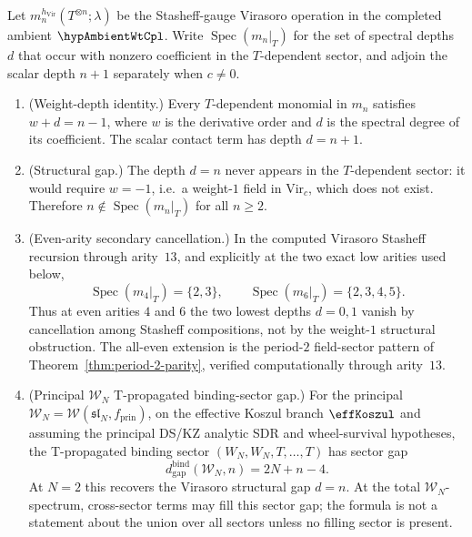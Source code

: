 \begin{theorem}
\label{thm:gap-migration}%
%
%
Let \(m_n^{h_{\mathrm{Vir}}}(T^{\otimes n};\lambda)\) be the
Stasheff-gauge Virasoro operation in the completed ambient
\(\hypAmbientWtCpl\).  Write
\(\operatorname{Spec}(m_n|_T)\) for the set of spectral depths~\(d\)
that occur with nonzero coefficient in the \(T\)-dependent sector, and
adjoin the scalar depth \(n+1\) separately when \(c\ne0\).
\begin{enumerate}[label=\textup{(\roman*)}]
\item \textup{(Weight-depth identity.)}
 Every $T$-dependent monomial in $m_n$ satisfies
 $w + d = n - 1$, where $w$ is the derivative order and $d$ is
 the spectral degree of its coefficient. The scalar contact
 term has depth $d = n + 1$.
\item \textup{(Structural gap.)}
 The depth $d = n$ never appears in the $T$-dependent sector:
 it would require $w = -1$, i.e.\ a weight-$1$ field in
 $\mathrm{Vir}_c$, which does not exist. Therefore
 $n \notin \operatorname{Spec}(m_n|_T)$ for all $n \ge 2$.
\item \textup{(Even-arity secondary cancellation.)}
 In the computed Virasoro Stasheff recursion through arity~$13$, and
 explicitly at the two exact low arities used below,
 \[
 \operatorname{Spec}(m_4|_T)=\{2,3\},
 \qquad
 \operatorname{Spec}(m_6|_T)=\{2,3,4,5\}.
 \]
 Thus at even arities \(4\) and \(6\) the two lowest depths
 \(d=0,1\) vanish by cancellation among Stasheff compositions, not by
 the weight-\(1\) structural obstruction.  The all-even extension is
 the period-\(2\) field-sector pattern of
 Theorem~\ref{thm:period-2-parity}, verified computationally through
 arity~$13$.
\item \textup{(Principal \(\mathcal W_N\) T-propagated binding-sector gap.)}
 For the principal
 \(\mathcal{W}_N=\mathcal{W}(\mathfrak{sl}_N,f_{\mathrm{prin}})\),
 on the effective Koszul branch \(\effKoszul\) and assuming the
 principal DS/KZ analytic SDR and wheel-survival hypotheses, the
 T-propagated binding sector
 \((W_N,W_N,T,\ldots,T)\) has sector gap
 \[
 d_{\mathrm{gap}}^{\mathrm{bind}}(\mathcal{W}_N,n)
 =2N+n-4 .
 \]
 At \(N=2\) this recovers the Virasoro structural gap \(d=n\).
 At the total \(\mathcal W_N\)-spectrum, cross-sector terms may fill
 this sector gap; the formula is not a statement about the union over
 all sectors unless no filling sector is present.
\end{enumerate}
\end{theorem}

